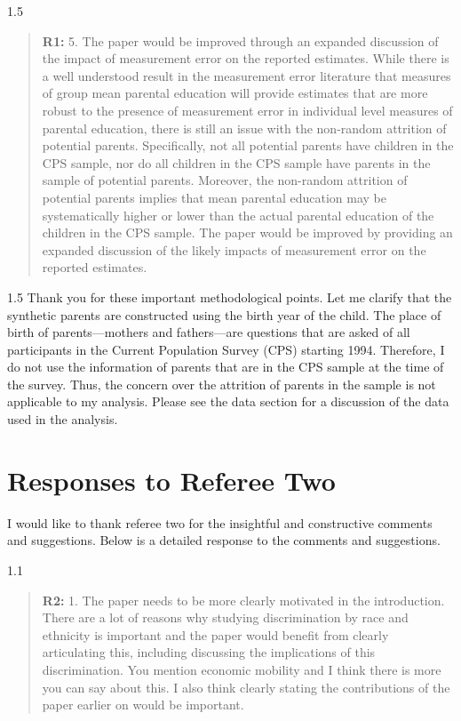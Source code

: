 \documentclass[12pt,english]{article}
\newcommand{\rrquote}{1.1}
\newcommand{\rrxspc}{1.5}
\begin{document}
\begin{refsection}
    \begin{spacing}{\rrxspc}
        \begin{quotation}
            \textbf{R1: } 5. The paper would be improved through an expanded discussion of the impact of measurement error on the reported estimates. While there is a well understood result in the measurement error literature that measures of group mean parental education will provide estimates that are more robust to the presence of measurement error in individual level measures of parental education, there is still an issue with the non-random attrition of potential parents. Specifically, not all potential parents have children in the CPS sample, nor do all children in the CPS sample have parents in the sample of potential parents. Moreover, the non-random attrition of potential parents implies that mean parental education may be systematically higher or lower than the actual parental education of the children in the CPS sample. The paper would be improved by providing an expanded discussion of the likely impacts of measurement error on the reported estimates.
        \end{quotation}
    \end{spacing}

    \begin{spacing}{\rrxspc}
        Thank you for these important methodological points. Let me clarify that the synthetic parents are constructed using the birth year of the child. The place of birth of parents---mothers and fathers---are questions that are asked of all participants in the Current Population Survey (CPS) starting 1994. Therefore, I do not use the information of parents that are in the CPS sample at the time of the survey. Thus, the concern over the attrition of parents in the sample is not applicable to my analysis. Please see the data section for a discussion of the data used in the analysis.
    \end{spacing}
    \clearpage
    \pagebreak

    \section{Responses to Referee Two}
    I would like to thank referee two for the insightful and constructive comments and suggestions. Below is a detailed response to the comments and suggestions.

    \begin{spacing}{\rrquote}
        \begin{quotation}
        \textbf{R2: } 1. The paper needs to be more clearly motivated in the introduction. There are a lot of reasons why studying discrimination by race and ethnicity is important and the paper would benefit from clearly articulating this, including discussing the implications of this discrimination. You mention economic mobility and I think there is more you can say about this. I also think clearly stating the contributions of the paper earlier on would be important.
        \end{quotation}
        \end{spacing}
        

\end{refsection}
\end{document}
